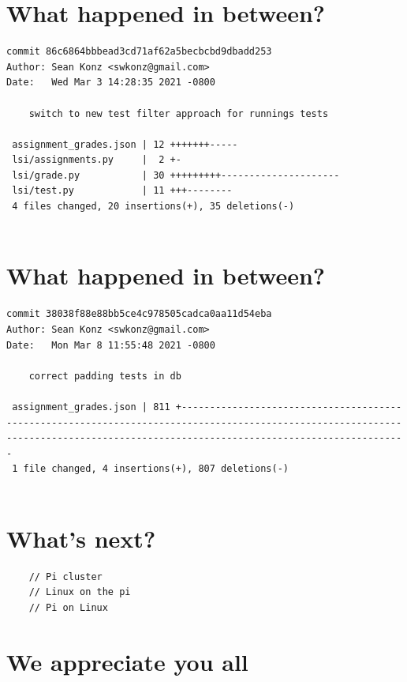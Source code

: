 \documentclass{article}
\begin{document}
\newpage


\section*{What happened in between?}
\vspace{2ex}
\begin{verbatim}
commit 86c6864bbbead3cd71af62a5becbcbd9dbadd253
Author: Sean Konz <swkonz@gmail.com>
Date:   Wed Mar 3 14:28:35 2021 -0800

    switch to new test filter approach for runnings tests

 assignment_grades.json | 12 +++++++-----
 lsi/assignments.py     |  2 +-
 lsi/grade.py           | 30 +++++++++---------------------
 lsi/test.py            | 11 +++--------
 4 files changed, 20 insertions(+), 35 deletions(-)


\end{verbatim}

\newpage

\section*{What happened in between?}
\vspace{2ex}
\begin{verbatim}
commit 38038f88e88bb5ce4c978505cadca0aa11d54eba
Author: Sean Konz <swkonz@gmail.com>
Date:   Mon Mar 8 11:55:48 2021 -0800

    correct padding tests in db

 assignment_grades.json | 811 +------------------------------------------------------------------------------------------------------------------------------------------------------------------------------------
 1 file changed, 4 insertions(+), 807 deletions(-)


\end{verbatim}

\newpage

\section*{What's next?}
\vspace{2ex}
\begin{verbatim}
    // Pi cluster
    // Linux on the pi
    // Pi on Linux
\end{verbatim}
\newpage

\section*{We appreciate you all}

\newpage
\end{document}
